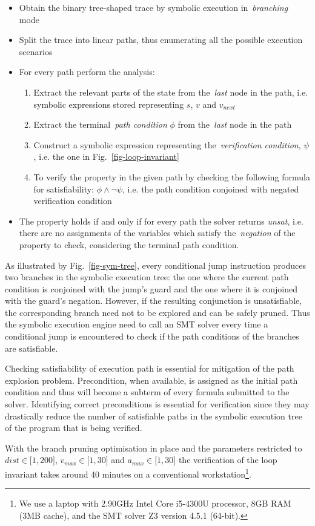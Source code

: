 \begin{itemize}
  \item Obtain the binary tree-shaped trace by symbolic execution in~\emph{branching} mode
  \item Split the trace into linear paths, thus enumerating all the possible
    execution scenarios
  \item For every path perform the analysis:
    \begin{enumerate}
      \item Extract the relevant parts of the state from the~\emph{last} node in
        the path, i.e. symbolic expressions stored representing $s$,
        $v$ and $v_{next}$
      \item Extract the terminal~\emph{path condition} $\phi$
            from the~\emph{last} node in the path
      \item Construct a symbolic expression representing the~\emph{verification condition},
            $\psi$, i.e. the one in Fig.~\ref{fig-loop-invariant}
      \item To verify the property in the given path by checking the following
        formula for satisfiability: $\phi \land \lnot\psi$, i.e. the path condition
        conjoined with negated verification condition

    \end{enumerate}
    \item  The property holds if and only if for every path the solver returns
           \emph{unsat}, i.e. there are no assignments of the variables which
           satisfy the~\emph{negation} of the property to check, considering the
           terminal path condition.
\end{itemize}

As illustrated by Fig.~\ref{fig-sym-tree}, every conditional jump instruction produces
two branches in the symbolic execution tree: the one
where the current path condition is conjoined with the jump's guard and the one where it is
conjoined with the guard's negation. However, if the resulting
conjunction is unsatisfiable, the corresponding branch need not to be explored
and can be safely pruned.
Thus the symbolic execution engine need to call an SMT solver every
time a conditional jump is encountered to check if the path conditions of the branches
are satisfiable.

Checking satisfiability of execution path is essential for mitigation of the path explosion
problem. Precondition, when available, is assigned as the initial path condition and thus
will become a subterm of every formula submitted to the solver.
Identifying correct preconditions is essential for verification since they may
drastically reduce the number of satisfiable paths in the symbolic execution tree
of the program that is being verified.

With the branch pruning optimisation in place and the parameters restricted
to $dist \in \mathopen[1, 200\mathclose]$, $v_{max} \in \mathopen[1, 30\mathclose]$ and
$a_{max} \in \mathopen[1, 30\mathclose]$ the verification of the loop invariant
takes around 40 minutes on a conventional workstation\footnote{We use a laptop
with 2.90GHz Intel Core i5-4300U processor, 8GB RAM (3MB cache),
and the SMT solver Z3 version 4.5.1 (64-bit).}.